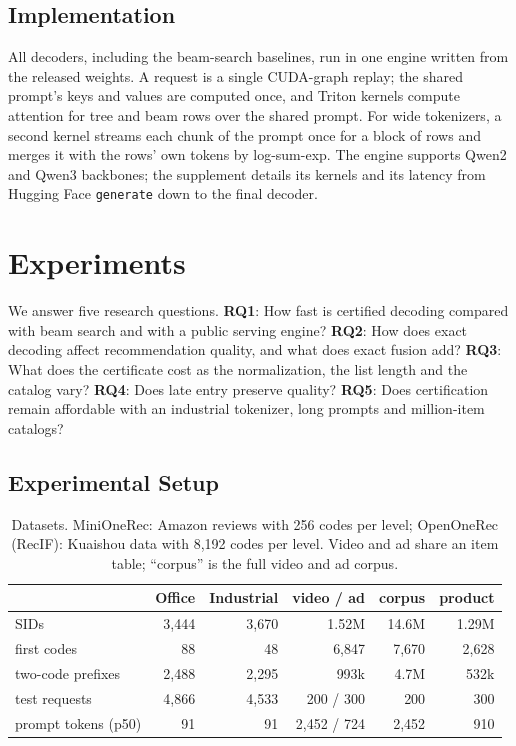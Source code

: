 \documentclass[sigconf,anonymous]{acmart}
\begin{document}
\subsection{Implementation}
\label{sec:engine}
All decoders, including the beam-search baselines, run in one engine written from the released weights. A request
is a single CUDA-graph replay; the shared prompt's keys and values are computed once, and Triton kernels compute
attention for tree and beam rows over the shared prompt. For wide tokenizers, a second kernel streams each chunk of
the prompt once for a block of rows and merges it with the rows' own tokens by log-sum-exp. The engine supports
Qwen2 and Qwen3 backbones; the supplement details its kernels and its latency from Hugging Face \texttt{generate}
down to the final decoder.

\section{Experiments}
\label{sec:experiments}

We answer five research questions. \textbf{RQ1}: How fast is certified decoding compared with beam search and with a
public serving engine? \textbf{RQ2}: How does exact decoding affect recommendation quality, and what does exact
fusion add? \textbf{RQ3}: What does the certificate cost as the normalization, the list length and the catalog
vary? \textbf{RQ4}: Does late entry preserve quality? \textbf{RQ5}: Does certification remain affordable with an
industrial tokenizer, long prompts and million-item catalogs?

\subsection{Experimental Setup}
\label{sec:setup}

\begin{table}[t]
\caption{Datasets. MiniOneRec: Amazon reviews with 256 codes per level; OpenOneRec (RecIF): Kuaishou data with 8,192
codes per level. Video and ad share an item table; ``corpus'' is the full video and ad corpus.}
\label{tab:data}
\vspace{-2mm}
\footnotesize
\setlength{\tabcolsep}{2pt}
\begin{tabular*}{\linewidth}{@{\extracolsep{\fill}}lrrrrr@{}}
\toprule
 & Office & Industrial & video / ad & corpus & product \\
\midrule
SIDs                 & 3,444 & 3,670 & 1.52M & 14.6M & 1.29M \\
first codes          & 88    & 48    & 6,847 & 7,670 & 2,628 \\
two-code prefixes    & 2,488 & 2,295 & 993k  & 4.7M  & 532k \\
test requests        & 4,866 & 4,533 & 200 / 300 & 200 & 300 \\
prompt tokens (p50)  & 91    & 91    & 2,452 / 724 & 2,452 & 910 \\
\bottomrule
\end{tabular*}
\vspace{-3mm}
\end{table}
\end{document}
